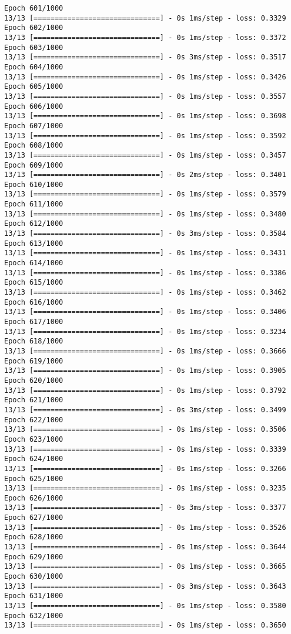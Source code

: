 \documentclass[11pt]{article}
\begin{document}
\begin{Verbatim}[commandchars=\\\{\}]
Epoch 601/1000
13/13 [==============================] - 0s 1ms/step - loss: 0.3329
Epoch 602/1000
13/13 [==============================] - 0s 1ms/step - loss: 0.3372
Epoch 603/1000
13/13 [==============================] - 0s 3ms/step - loss: 0.3517
Epoch 604/1000
13/13 [==============================] - 0s 1ms/step - loss: 0.3426
Epoch 605/1000
13/13 [==============================] - 0s 1ms/step - loss: 0.3557
Epoch 606/1000
13/13 [==============================] - 0s 1ms/step - loss: 0.3698
Epoch 607/1000
13/13 [==============================] - 0s 1ms/step - loss: 0.3592
Epoch 608/1000
13/13 [==============================] - 0s 1ms/step - loss: 0.3457
Epoch 609/1000
13/13 [==============================] - 0s 2ms/step - loss: 0.3401
Epoch 610/1000
13/13 [==============================] - 0s 1ms/step - loss: 0.3579
Epoch 611/1000
13/13 [==============================] - 0s 1ms/step - loss: 0.3480
Epoch 612/1000
13/13 [==============================] - 0s 3ms/step - loss: 0.3584
Epoch 613/1000
13/13 [==============================] - 0s 1ms/step - loss: 0.3431
Epoch 614/1000
13/13 [==============================] - 0s 1ms/step - loss: 0.3386
Epoch 615/1000
13/13 [==============================] - 0s 1ms/step - loss: 0.3462
Epoch 616/1000
13/13 [==============================] - 0s 1ms/step - loss: 0.3406
Epoch 617/1000
13/13 [==============================] - 0s 1ms/step - loss: 0.3234
Epoch 618/1000
13/13 [==============================] - 0s 1ms/step - loss: 0.3666
Epoch 619/1000
13/13 [==============================] - 0s 1ms/step - loss: 0.3905
Epoch 620/1000
13/13 [==============================] - 0s 1ms/step - loss: 0.3792
Epoch 621/1000
13/13 [==============================] - 0s 3ms/step - loss: 0.3499
Epoch 622/1000
13/13 [==============================] - 0s 1ms/step - loss: 0.3506
Epoch 623/1000
13/13 [==============================] - 0s 1ms/step - loss: 0.3339
Epoch 624/1000
13/13 [==============================] - 0s 1ms/step - loss: 0.3266
Epoch 625/1000
13/13 [==============================] - 0s 1ms/step - loss: 0.3235
Epoch 626/1000
13/13 [==============================] - 0s 3ms/step - loss: 0.3377
Epoch 627/1000
13/13 [==============================] - 0s 1ms/step - loss: 0.3526
Epoch 628/1000
13/13 [==============================] - 0s 1ms/step - loss: 0.3644
Epoch 629/1000
13/13 [==============================] - 0s 1ms/step - loss: 0.3665
Epoch 630/1000
13/13 [==============================] - 0s 3ms/step - loss: 0.3643
Epoch 631/1000
13/13 [==============================] - 0s 1ms/step - loss: 0.3580
Epoch 632/1000
13/13 [==============================] - 0s 1ms/step - loss: 0.3650

\end{Verbatim}
\end{document}
